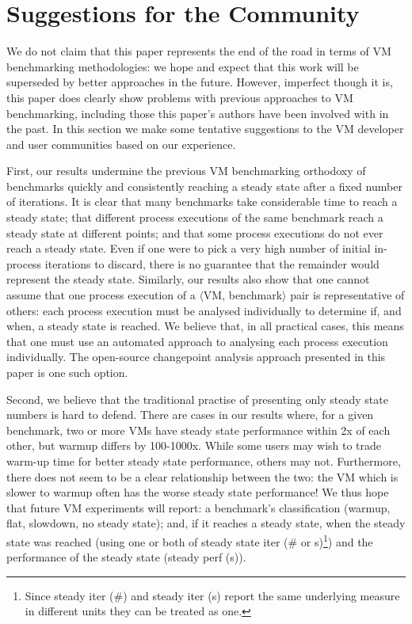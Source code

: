 \documentclass[acmsmall,screen]{acmart}
\newcommand{\vmbpair}{$\langle$VM, benchmark$\rangle$\xspace}
\begin{document}
\section{Suggestions for the Community}
\label{suggestions}

We do not claim that this paper represents the end of the road in terms of VM
benchmarking methodologies: we hope and expect that this work will be superseded
by better approaches in the future. However, imperfect though it is, this paper
does clearly show problems with previous approaches to VM
benchmarking, including those this paper's authors have been involved with in the past. In this
section we make some tentative suggestions to the VM developer and user
communities based on our experience.

First, our results undermine the previous VM benchmarking orthodoxy of benchmarks
quickly and consistently reaching a steady state after a fixed number of iterations. It is clear
that many benchmarks take considerable time to reach a
steady state; that different process executions of the same benchmark reach a
steady state at different points; and that some process executions do not ever
reach a steady state. Even if one were to pick a very high number of initial in-process
iterations to discard, there is no guarantee that the remainder
would represent the steady state. Similarly, our results also show that one cannot assume
that one process execution of a \vmbpair pair is representative of others: each
process execution must be analysed individually to determine if, and when, a steady state is
reached. We believe that, in all practical cases, this means that one must use
an automated approach to analysing each process execution individually.
The open-source changepoint analysis approach presented in this paper is one such option.

Second, we believe that the traditional practise of presenting only steady state
numbers is hard to defend. There
are cases in our results where, for a given benchmark, two or more VMs have
steady state performance within 2x of each other, but warmup differs
by 100-1000x. While some users may wish to trade warm-up time for
better steady state performance, others may not. Furthermore, there does not
seem to be a clear relationship between the two: the VM which is
slower to warmup often has the worse steady
state performance!  We thus hope that future VM experiments will
report: a benchmark's classification (warmup, flat, slowdown, no steady state);
and, if it reaches a steady state, when the steady state was reached (using
one or both of steady state iter (\# or s)\footnote{Since steady iter (\#) and
steady iter (s) report the same underlying measure in different
units they can be treated as one.}) and the performance of the
steady state (steady perf (s)).
\end{document}
